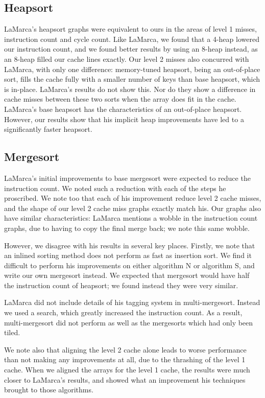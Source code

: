 \subsection{Heapsort}

LaMarca's heapsort graphs were equivalent to ours in the areas of level 1
misses, instruction count and cycle count. Like LaMarca, we found that a 4-heap
lowered our instruction count, and we found better results by using an 8-heap
instead, as an 8-heap filled our cache lines exactly. Our level 2 misses also
concurred with LaMarca, with only one difference: memory-tuned heapsort, being
an out-of-place sort, fills the cache fully with a smaller number of keys than
base heapsort, which is in-place. LaMarca's results do not show this. Nor do
they show a difference in cache misses between these two sorts when the array
does fit in the cache. LaMarca's base heapsort has the characteristics of an
out-of-place heapsort. However, our results show that his implicit heap
improvements have led to a significantly faster heapsort.


\subsection{Mergesort}

LaMarca's initial improvements to base mergesort were expected to reduce the
instruction count. We noted such a reduction with each of the steps he
proscribed. We note too that each of his improvement reduce level 2 cache
misses, and the shape of our level 2 cache miss graphs exactly match his. Our
graphs also have similar characteristics: LaMarca mentions a wobble in the
instruction count graphs, due to having to copy the final merge back; we note
this same wobble.

However, we disagree with his results in several key places. Firstly, we note
that an inlined sorting method does not perform as fast as insertion sort. We
find it difficult to perform his improvements on either algorithm N or algorithm
S, and write our own mergesort instead. We expected that mergesort would have
half the instruction count of heapsort; we found instead they were very similar.

LaMarca did not include details of his tagging system in multi-mergesort.
Instead we used a search, which greatly increased the instruction count. As a
result, multi-mergesort did not perform as well as the mergesorts which had only
been tiled. 

We note also that aligning the level 2 cache alone leads to worse performance
than not making any improvements at all, due to the thrashing of the level 1
cache. When we aligned the arrays for the level 1 cache, the results were much
closer to LaMarca's results, and showed what an improvement his techniques
brought to those algorithms.

